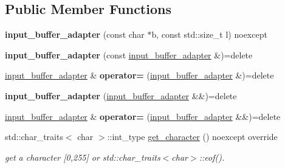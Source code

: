 \subsection*{Public Member Functions}
\begin{DoxyCompactItemize}
\item 
\mbox{\label{classnlohmann_1_1detail_1_1input__buffer__adapter_ad9b912fabdcb53de255e8c444d625ac3}} 
{\bfseries input\+\_\+buffer\+\_\+adapter} (const char $\ast$b, const std\+::size\+\_\+t l) noexcept
\item 
\mbox{\label{classnlohmann_1_1detail_1_1input__buffer__adapter_ada76d7b75c5d6b989af0e18687ef07b6}} 
{\bfseries input\+\_\+buffer\+\_\+adapter} (const \mbox{\hyperlink{classnlohmann_1_1detail_1_1input__buffer__adapter}{input\+\_\+buffer\+\_\+adapter}} \&)=delete
\item 
\mbox{\label{classnlohmann_1_1detail_1_1input__buffer__adapter_a0871125057d993684ba8e45fb2b8a76b}} 
\mbox{\hyperlink{classnlohmann_1_1detail_1_1input__buffer__adapter}{input\+\_\+buffer\+\_\+adapter}} \& {\bfseries operator=} (\mbox{\hyperlink{classnlohmann_1_1detail_1_1input__buffer__adapter}{input\+\_\+buffer\+\_\+adapter}} \&)=delete
\item 
\mbox{\label{classnlohmann_1_1detail_1_1input__buffer__adapter_ab6bc6bb785408b74af284a5b7544d9dc}} 
{\bfseries input\+\_\+buffer\+\_\+adapter} (\mbox{\hyperlink{classnlohmann_1_1detail_1_1input__buffer__adapter}{input\+\_\+buffer\+\_\+adapter}} \&\&)=delete
\item 
\mbox{\label{classnlohmann_1_1detail_1_1input__buffer__adapter_a19bb3ff68048a2fc8ecc41a013af37ae}} 
\mbox{\hyperlink{classnlohmann_1_1detail_1_1input__buffer__adapter}{input\+\_\+buffer\+\_\+adapter}} \& {\bfseries operator=} (\mbox{\hyperlink{classnlohmann_1_1detail_1_1input__buffer__adapter}{input\+\_\+buffer\+\_\+adapter}} \&\&)=delete
\item 
\mbox{\label{classnlohmann_1_1detail_1_1input__buffer__adapter_ae9e195b04f3551fafb0925aafba00124}} 
std\+::char\+\_\+traits$<$ char $>$\+::int\+\_\+type \mbox{\hyperlink{classnlohmann_1_1detail_1_1input__buffer__adapter_ae9e195b04f3551fafb0925aafba00124}{get\+\_\+character}} () noexcept override
\begin{DoxyCompactList}\small\item\em get a character \mbox{[}0,255\mbox{]} or std\+::char\+\_\+traits$<$char$>$\+::eof(). \end{DoxyCompactList}\end{DoxyCompactItemize}
